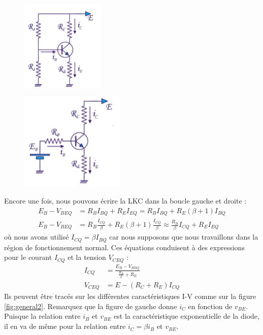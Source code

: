 \begin{figure}[h!]
	\centering
	\begin{minipage}{.5\textwidth}
		\centering
		\includegraphics[width=4cm]{figures/ch02/general1a.jpg}
		\label{fig:general1a}
	\end{minipage}%
	\begin{minipage}{.5\textwidth}
		\centering
		\includegraphics[width=5cm]{figures/ch02/general1b.jpg}
		\label{fig:general1b}
	\end{minipage}
\end{figure}
Encore une fois, nous pouvons écrire la LKC dans la boucle gauche et droite :
\begin{equation}
	\begin{split}
		E_B - V_{BEQ} &= R_B I_{BQ} + R_E I_{EQ} = R_B I_{BQ} + R_E (\beta + 1) I_{BQ} \\
		E_B - V_{BEQ} &= R_B \frac{I_{CQ}}{\beta} + R_E (\beta + 1) \frac{I_{CQ}}{\beta} \approx \frac{R_B}{\beta} I_{CQ} + R_E I_{EQ}
	\end{split}
\end{equation}
où nous avons utilisé $I_{CQ} = \beta I_{BQ}$ car nous supposons que nous travaillons dans la région de fonctionnement normal. Ces équations conduisent à des expressions pour le courant $I_{CQ}$ et la tension $V_{CEQ}$ :
\begin{equation}
	\begin{split}
		I_{CQ} &= \frac{E_B - V_{BEQ}}{\frac{R_B}{\beta} + R_E}\\
		V_{CEQ} &= E - (R_C + R_E) I_{CQ}
	\end{split}
	\label{eq:four_resitors1}
\end{equation}
Ils peuvent être tracés sur les différentes caractéristiques I-V comme sur la figure \ref{fig:general2}. Remarquez que la figure de gauche donne $i_C$ en fonction de $v_{BE}$. Puisque la relation entre $i_B$ et $v_{BE}$ est la caractéristique exponentielle de la diode, il en va de même pour la relation entre $i_C = \beta i_B$ et $v_{BE}$.

